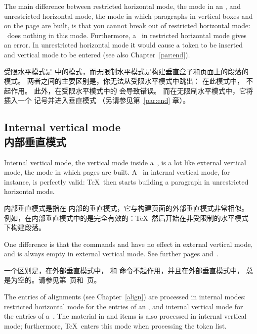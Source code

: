 The main difference between restricted horizontal mode,
the mode in an , and unrestricted horizontal mode,
the mode in which paragraphs in vertical boxes
and on the page are built,
is that you cannot break out of restricted horizontal mode: 
~does nothing in this mode. 
Furthermore, a~ in restricted horizontal
mode gives an error. 
In unrestricted horizontal mode it would cause a
 token to be inserted and vertical mode to be entered
(see also Chapter~\ref{par:end}).
\awp

受限水平模式是  中的模式，而无限制水平模式是构建垂直盒子和页面上的段落的模式。
两者之间的主要区别是，你无法从受限水平模式中跳出：
在此模式中， 不起作用。
此外，在受限水平模式中的  会导致错误。
而在无限制水平模式中，它将插入一个  记号并进入垂直模式
（另请参见第~\ref{par:end} 章）。

\subsection{Internal vertical mode\\内部垂直模式}

Internal vertical mode, the vertical mode inside
a~, is a lot like external vertical
mode, the mode in which pages are built.
A~ in internal vertical mode,
for instance, is perfectly valid:
\TeX\ then starts building a paragraph in
unrestricted horizontal mode.

内部垂直模式是指在  内部的垂直模式，它与构建页面的外部垂直模式非常相似。例如，在内部垂直模式中的是完全有效的：\TeX\ 然后开始在非受限制的水平模式下构建段落。

One difference is that the commands
 and  have no effect
in external vertical mode, and
 is always empty in external vertical mode.
See further pages \pageref{lastbox} and~\pageref{unskip}.

一个区别是，在外部垂直模式中， 和  命令不起作用，并且在外部垂直模式中， 总是为空的。请参见第~\pageref{lastbox}页和\pageref{unskip}~页。

The entries of alignments (see Chapter~\ref{align}) are 
processed in internal modes: restricted horizontal mode
for the entries of an , and internal vertical
mode for the entries of a~.
The material in    and  items
is also processed in internal vertical mode; furthermore,
\TeX\ enters this mode when processing the  token list.

